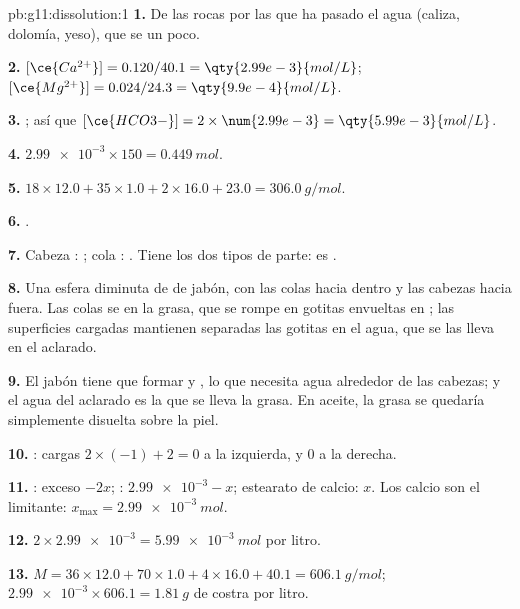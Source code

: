 \begin{solution}{pb:g11:dissolution:1}
\textbf{1.} De las rocas por las que ha pasado el agua (caliza,
dolomía, yeso), que se  un poco.

\textbf{2.} $[\ce{Ca^{2+}}] = 0.120 / 40.1 = \qty{2.99e-3}{mol/L}$;
$[\ce{Mg^{2+}}] = 0.024 / 24.3 = \qty{9.9e-4}{mol/L}$.

\textbf{3.} ; así que
$[\ce{HCO3-}] = 2 \times \num{2.99e-3} = \qty{5.99e-3}{mol/L}$.

\textbf{4.} $\num{2.99e-3} \times 150 = \qty{0.449}{mol}$.

\textbf{5.} $18 \times 12.0 + 35 \times 1.0 + 2 \times 16.0 + 23.0 =
\qty{306.0}{g/mol}$.

\textbf{6.} .

\textbf{7.} Cabeza : ; cola : .
Tiene los dos tipos de parte: es .

\textbf{8.} Una esfera diminuta de  de jabón, con las colas hacia
dentro y las cabezas hacia fuera. Las colas se  en la grasa,
que se rompe en gotitas envueltas en ; las superficies cargadas
mantienen separadas las gotitas en el agua, que se las lleva en el
aclarado.

\textbf{9.} El jabón tiene que formar  y , lo que necesita
agua alrededor de las cabezas; y el agua del aclarado es la que se lleva
la grasa. En aceite, la grasa se quedaría simplemente disuelta sobre la
piel.

\textbf{10.} : cargas
$2 \times (-1) + 2 = 0$ a la izquierda, y $0$ a la derecha.

\textbf{11.} : exceso $- 2x$; :
$\num{2.99e-3} - x$; estearato de calcio: $x$. Los  calcio son el
limitante: $x_{\max} = \qty{2.99e-3}{mol}$.

\textbf{12.} $2 \times \num{2.99e-3} = \qty{5.99e-3}{mol}$ por litro.

\textbf{13.} $M = 36 \times 12.0 + 70 \times 1.0 + 4 \times 16.0 + 40.1 =
\qty{606.1}{g/mol}$; $\num{2.99e-3} \times 606.1 = \qty{1.81}{g}$ de
costra por litro.


\end{solution}
